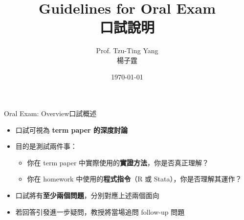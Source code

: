 \documentclass[dvipsnames,hyperref={pdfpagelabels=false}]{beamer}
\title[]
{Guidelines for Oral Exam \\ {\normalsize 口試說明}}
\author
{Prof. Tzu-Ting Yang  \\ 楊子霆}
\institute{Institute of Economics, Academia Sinica  \\ 中央研究院經濟研究所}
\date{\today}
\begin{document}
\begin{frame}{}
	\titlepage
\end{frame}


\begin{frame}{Oral Exam: Overview}{口試概述}

\begin{itemize}
	\item 口試可視為 \textbf{term paper 的深度討論}
	\vspace{0.3cm}

	\item 目的是測試兩件事：
	\vspace{0.2cm}
	\begin{itemize}
		\item[(1)] 你在 term paper 中實際使用的\textbf{實證方法}，你是否真正理解？
		\vspace{0.2cm}
		\item[(2)] 你在 homework 中使用的\textbf{程式指令}（R 或 Stata），你是否理解其運作？
	\end{itemize}
	\vspace{0.3cm}

	\item 口試將有\textbf{至少兩個問題}，分別對應上述兩個面向
	\vspace{0.3cm}

	\item 若回答引發進一步疑問，教授將當場追問 follow-up 問題
\end{itemize}

\end{frame}
\end{document}
